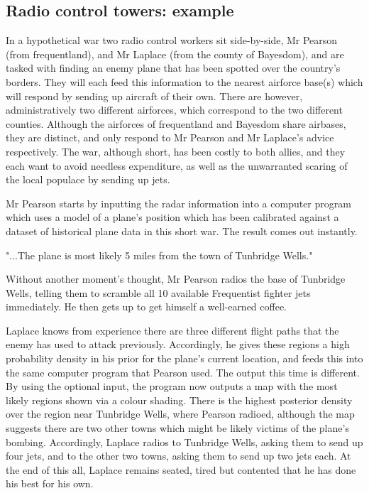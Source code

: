 \documentclass[11pt,fullpage]{book}
\begin{document}
\subsection{Radio control towers: example}
In a hypothetical war two radio control workers sit side-by-side, Mr Pearson (from frequentland), and Mr Laplace (from the county of Bayesdom), and are tasked with finding an enemy plane that has been spotted over the country's borders. They will each feed this information to the nearest airforce base(s) which will respond by sending up aircraft of their own. There are however, administratively two different airforces, which correspond to the two different counties. Although the airforces of frequentland and Bayesdom share airbases, they are distinct, and only respond to Mr Pearson and Mr Laplace's advice respectively. The war, although short, has been costly to both allies, and they each want to avoid needless expenditure, as well as the unwarranted scaring of the local populace by sending up jets.

Mr Pearson starts by inputting the radar information into a computer program which uses a model of a plane's position which has been calibrated against a dataset of historical plane data in this short war. The result comes out instantly. 

"...The plane is most likely 5 miles from the town of Tunbridge Wells."

Without another moment's thought, Mr Pearson radios the base of Tunbridge Wells, telling them to scramble all 10 available Frequentist fighter jets immediately. He then gets up to get himself a well-earned coffee.

Laplace knows from experience there are three different flight paths that the enemy has used to attack previously. Accordingly, he gives these regions a high probability density in his prior for the plane's current location, and feeds this into the same computer program that Pearson used. The output this time is different. By using the optional input, the program now outputs a map with the most likely regions shown via a colour shading. There is the highest posterior density over the region near Tunbridge Wells, where Pearson radioed, although the map suggests there are two other towns which might be likely victims of the plane's bombing. Accordingly, Laplace radios to Tunbridge Wells, asking them to send up four jets, and to the other two towns, asking them to send up two jets each. At the end of this all, Laplace remains seated, tired but contented that he has done his best for his own.
\end{document}
